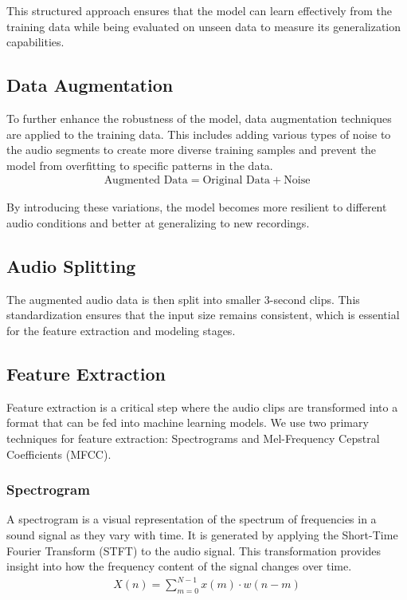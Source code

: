 This structured approach ensures that the model can learn effectively from the
training data while being evaluated on unseen data to measure its
generalization capabilities.

\subsection{Data Augmentation}

To further enhance the robustness of the model, data augmentation techniques
are applied to the training data. This includes adding various types of noise
to the audio segments to create more diverse training samples and prevent the
model from overfitting to specific patterns in the data.
\begin{eqnarray}
    \text{Augmented Data} = \text{Original Data} + \text{Noise}
\end{eqnarray}

By introducing these variations, the model becomes more resilient to different
audio conditions and better at generalizing to new recordings.

\subsection{Audio Splitting}

The augmented audio data is then split into smaller 3-second clips. This
standardization ensures that the input size remains consistent, which is
essential for the feature extraction and modeling stages.

\subsection{Feature Extraction}

Feature extraction is a critical step where the audio clips are transformed
into a format that can be fed into machine learning models. We use two primary
techniques for feature extraction: Spectrograms and Mel-Frequency Cepstral
Coefficients (MFCC).

\subsubsection{Spectrogram}

A spectrogram is a visual representation of the spectrum of frequencies in a
sound signal as they vary with time. It is generated by applying the Short-Time
Fourier Transform (STFT) to the audio signal. This transformation provides
insight into how the frequency content of the signal changes over time.
\begin{eqnarray}
    X(n) = \sum_{m=0}^{N-1} x(m) \cdot w(n-m)
\end{eqnarray}

